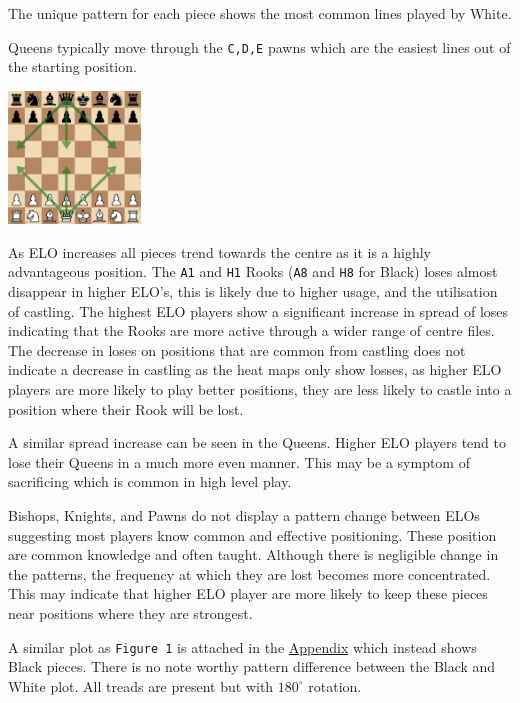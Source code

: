 \documentclass[11pt]{article}
\begin{document}
The unique pattern for each piece shows the most common lines played by White.

Queens typically move through the \texttt{C,D,E} pawns which are the easiest lines out of the starting position.
\begin{center}
\includegraphics[width=100pt]{Images/Queen lines.png}
\end{center}

As ELO increases all pieces trend towards the centre as it is a highly advantageous position. The \texttt{A1} and \texttt{H1} Rooks (\texttt{A8} and \texttt{H8} for Black) loses almost disappear in higher ELO's, this is likely due to higher usage, and the utilisation of castling. The highest ELO players show a significant increase in spread of loses indicating that the Rooks are more active through a wider range of centre files.
The decrease in loses on positions that are common from castling does not indicate a decrease in castling as the heat maps only show losses, as higher ELO players are more likely to play better positions, they are less likely to castle into a position where their Rook will be lost.

A similar spread increase can be seen in the Queens. Higher ELO players tend to lose their Queens in a much more even manner. This may be a symptom of sacrificing which is common in high level play.

Bishops, Knights, and Pawns do not display a pattern change between ELOs suggesting most players know common and effective positioning. These position are common knowledge and often taught. Although there is negligible change in the patterns, the frequency at which they are lost becomes more concentrated. This may indicate that higher ELO player are more likely to keep these pieces near positions where they are strongest.

A similar plot as \texttt{Figure 1} is attached in the \hyperref[sec:orgac6d72f]{Appendix} which instead shows Black pieces. There is no note worthy pattern difference between the Black and White plot. All treads are present but with \(180^{\circ}\) rotation.
\end{document}
